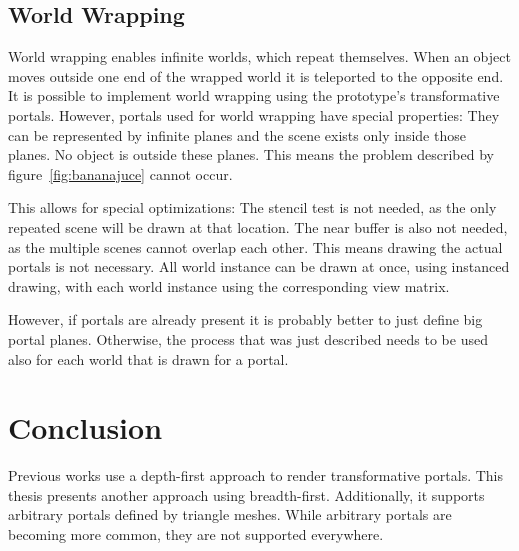 



\section{World Wrapping}
World wrapping enables infinite worlds, which repeat themselves. When an object moves outside one end of the wrapped world it is teleported to the opposite end. It is possible to implement world wrapping using the prototype's transformative portals. However, portals used for world wrapping have special properties: They can be represented by infinite planes and the scene exists only inside those planes. No object is outside these planes. This means the problem described by figure~\ref{fig:bananajuce} cannot occur.

This allows for special optimizations: The stencil test is not needed, as the only repeated scene will be drawn at that location. The near buffer is also not needed, as the multiple scenes cannot overlap each other. This means drawing the actual portals is not necessary. All world instance can be drawn at once, using instanced drawing, with each world instance using the corresponding view matrix.

However, if portals are already present it is probably better to just define big portal planes. Otherwise, the process that was just described needs to be used also for each world that is drawn for a portal.


\chapter{Conclusion}


Previous works use a depth-first approach to render transformative portals. This thesis presents another approach using breadth-first. Additionally, it supports arbitrary portals defined by triangle meshes. While arbitrary portals are becoming more common, they are not supported everywhere.

